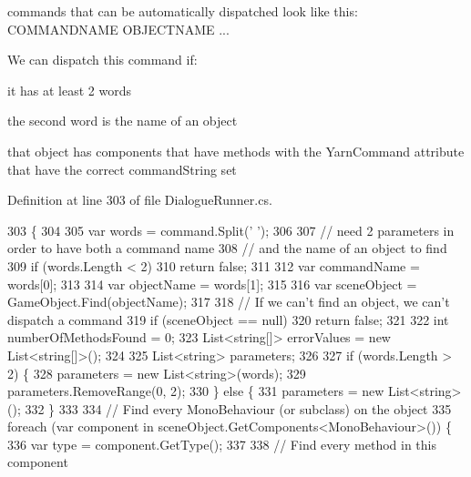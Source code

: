 commands that can be automatically dispatched look like this\-: C\-O\-M\-M\-A\-N\-D\-N\-A\-M\-E O\-B\-J\-E\-C\-T\-N\-A\-M\-E    ... 

We can dispatch this command if\-:
\begin{DoxyEnumerate}
\item it has at least 2 words
\item the second word is the name of an object
\item that object has components that have methods with the Yarn\-Command attribute that have the correct command\-String set 
\end{DoxyEnumerate}

Definition at line 303 of file Dialogue\-Runner.\-cs.


\begin{DoxyCode}
303                                                     \{
304 
305             var words = command.Split(\textcolor{charliteral}{' '});
306 
307             \textcolor{comment}{// need 2 parameters in order to have both a command name}
308             \textcolor{comment}{// and the name of an object to find}
309             \textcolor{keywordflow}{if} (words.Length < 2)
310                 \textcolor{keywordflow}{return} \textcolor{keyword}{false};
311 
312             var commandName = words[0];
313 
314             var objectName = words[1];
315 
316             var sceneObject = GameObject.Find(objectName);
317 
318             \textcolor{comment}{// If we can't find an object, we can't dispatch a command}
319             \textcolor{keywordflow}{if} (sceneObject == null)
320                 \textcolor{keywordflow}{return} \textcolor{keyword}{false};
321 
322             \textcolor{keywordtype}{int} numberOfMethodsFound = 0;
323             List<string[]> errorValues = \textcolor{keyword}{new} List<string[]>();
324 
325             List<string> parameters;
326 
327             \textcolor{keywordflow}{if} (words.Length > 2) \{
328                 parameters = \textcolor{keyword}{new} List<string>(words);
329                 parameters.RemoveRange(0, 2);
330             \} \textcolor{keywordflow}{else} \{
331                 parameters = \textcolor{keyword}{new} List<string>();
332             \}
333 
334             \textcolor{comment}{// Find every MonoBehaviour (or subclass) on the object}
335             \textcolor{keywordflow}{foreach} (var component \textcolor{keywordflow}{in} sceneObject.GetComponents<MonoBehaviour>()) \{
336                 var type = component.GetType();
337 
338                 \textcolor{comment}{// Find every method in this component}

\end{DoxyCode}
